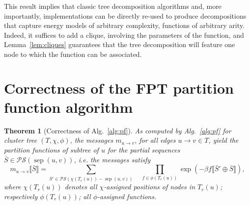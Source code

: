 \documentclass{bioinfo}
\newtheorem{theorem}{Theorem}
\newcommand{\val}{\bar S} %
\newcommand{\separator}[2]{\operatorname{sep}(#1,#2)}
\newcommand{\Message}[2]{m_{#1\rightarrow #2}}
\newcommand{\partseqs}{\mathcal{P\!S}}
\newcommand{\evalfor}[2]{#1\llbracket{}#2\rrbracket{}}
\newcommand{\substitute}[2]{#1\!\oplus\!#2}
\begin{document}
This result implies that classic tree decomposition algorithms and, more importantly, implementations can be directly re-used to produce decompositions that capture energy models of arbitrary complexity, functions of arbitrary arity. Indeed, it suffices to add a clique, involving the parameters of the function, and Lemma~\ref{lem:cliques} guarantees that the tree decomposition will feature one node to which the function can be associated.


\section{Correctness of the FPT partition function algorithm}
\label{appsec:correctness}

\begin{theorem}[Correctness of Alg.~\ref{alg:pf}]
  \label{the:pfalgo-correctness}
  As computed by Alg.~\ref{alg:pf} for cluster tree $(T,\chi,\phi)$,
  the messages $\Message{u}{v}$, for all edges $u\to{}v\in T$, yield
  the partition functions of subtree of $u$ for the partial sequences
  $\val\in\partseqs(\separator{u}{v})$, i.e. the messages satisfy
  \begin{equation}
   \evalfor{\Message{u}{v}}{\val} = \sum_{\val'\in\partseqs(\chi(T_r(u))-\separator{u}{v})} \quad
   \prod_{f\in\phi(T_r(u))} \exp(-\beta \evalfor{f}{\substitute{\val'}{\val}}),\label{eq:pfalgo-correct}
 \end{equation}
 where $\chi(T_r(u))$ denotes all $\chi$-assigned positions of nodes in $T_r(u)$;
 respectively $\phi(T_r(u))$; all $\phi$-assigned functions.
%
\end{theorem}
\end{document}
